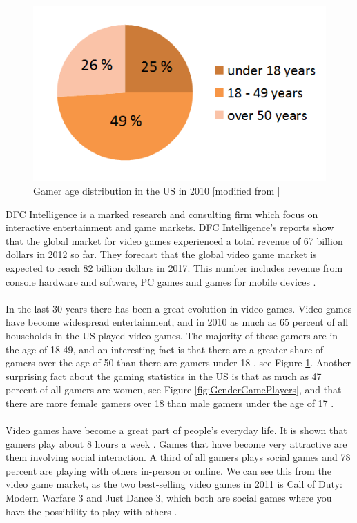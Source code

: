\begin{figure}
\begin{center}
\includegraphics[scale=0.5]{gamersus}
\caption[Gamer age distribution]{Gamer age distribution in the US in 2010 [modified from \cite{statistics2012}]}
\label{fig:GamersUS}
\end{center}
\end{figure}
DFC Intelligence is a marked research and consulting firm which focus on interactive entertainment and game markets. DFC Intelligence's reports show that the global market for video games experienced a total revenue of 67 billion dollars in 2012 so far. They forecast that the global video game market is expected to reach 82 billion dollars in 2017. This number includes revenue from console hardware and software, PC games and games for mobile devices \cite{videogameforcast} \cite{aboutdfcint}.\\ \\
In the last 30 years there has been a great evolution in video games. Video games have become widespread entertainment, and in 2010 as much as 65 percent of all households in the US played video games. The majority of these gamers are in the age of 18-49, and an interesting fact is that there are a greater share of gamers over the age of 50 than there are gamers under 18 \cite{statistics2010} \cite{statistics2012}, see Figure \ref{fig:GamersUS}. Another surprising fact about the gaming statistics in the US is that as much as 47 percent of all gamers are women, see Figure \ref{fig:GenderGamePlayers}, and that there are more female gamers over 18 than male gamers under the age of 17 \cite{statistics2012real}. \\ \\
Video games have become a great part of people's everyday life. It is shown that gamers play about 8 hours a week \cite{statistics2010}. Games that have become very attractive are them involving social interaction. A third of all gamers plays social games and 78 percent are playing with others in-person or online. We can see this from the video game market, as the two best-selling video games in 2011 is Call of Duty: Modern Warfare 3 and Just Dance 3, which both are social games where you have the possibility to play with others \cite{statistics2012real}. \\ \\ 
